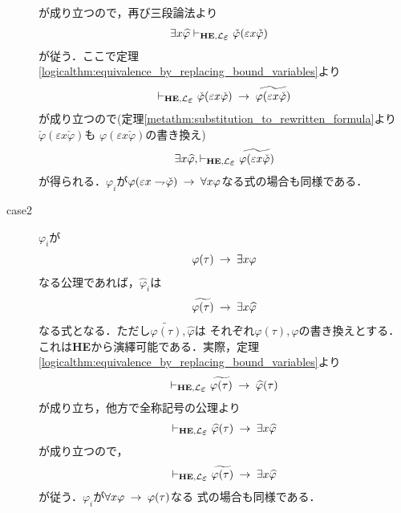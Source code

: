 \begin{metaprf}
\begin{description}
				が成り立つので，再び三段論法より
				\begin{align}
					\exists x \widehat{\varphi} &\provable{\mbox{{\bf HE}},\lang{\varepsilon}} \check{\varphi}(\varepsilon x \check{\varphi})
				\end{align}
				が従う．ここで定理\ref{logicalthm:equivalence_by_replacing_bound_variables}より
				\begin{align}
					\provable{\mbox{{\bf HE}},\lang{\varepsilon}} \check{\varphi}(\varepsilon x \check{\varphi}) \rarrow  \widetilde{\varphi(\varepsilon x \check{\varphi})}
				\end{align}
				が成り立つので(定理\ref{metathm:substitution_to_rewritten_formula}より
				$\check{\varphi}(\varepsilon x \check{\varphi})$も
				$\varphi(\varepsilon x \check{\varphi})$の書き換え)
				\begin{align}
					\exists x \widehat{\varphi}, \provable{\mbox{{\bf HE}},\lang{\varepsilon}} \widetilde{\varphi(\varepsilon x \check{\varphi})}
				\end{align}
				が得られる．$\varphi_{i}$が$\varphi(\varepsilon x \rightharpoondown\hspace{-0.25em} \check{\varphi}) \hspace{0.25em}\rightarrow\hspace{0.25em} \forall x \varphi$なる式の場合も同様である．
				
			\item[case2] $\varphi_{i}$が
				\begin{align}
					\varphi(\tau) \hspace{0.25em}\rightarrow\hspace{0.25em} \exists x \varphi
				\end{align}
				なる公理であれば，$\widehat{\varphi}_{i}$は
				\begin{align}
					\widetilde{\varphi(\tau)} \hspace{0.25em}\rightarrow\hspace{0.25em} \exists x \widehat{\varphi}
				\end{align}
				なる式となる．ただし$\widetilde{\varphi(\tau)},\widehat{\varphi}$は
				それぞれ$\varphi(\tau),\varphi$の書き換えとする．
				これは{\bf HE}から演繹可能である．実際，定理\ref{logicalthm:equivalence_by_replacing_bound_variables}より
				\begin{align}
					\provable{\mbox{{\bf HE}},\lang{\varepsilon}} 
					\widetilde{\varphi(\tau)} \rarrow \widehat{\varphi}(\tau)
				\end{align}
				が成り立ち，他方で全称記号の公理より
				\begin{align}
					\provable{\mbox{{\bf HE}},\lang{\varepsilon}} 
					\widehat{\varphi}(\tau) \rarrow \exists x \widehat{\varphi}
				\end{align}
				が成り立つので，
				\begin{align}
					\provable{\mbox{{\bf HE}},\lang{\varepsilon}} 
					\widetilde{\varphi(\tau)} \rarrow \exists x \widehat{\varphi}
				\end{align}
				が従う．$\varphi_{i}$が$\forall x \varphi \hspace{0.25em}\rightarrow\hspace{0.25em} \varphi(\tau)$なる
				式の場合も同様である．
				

\end{description}
\end{metaprf}
